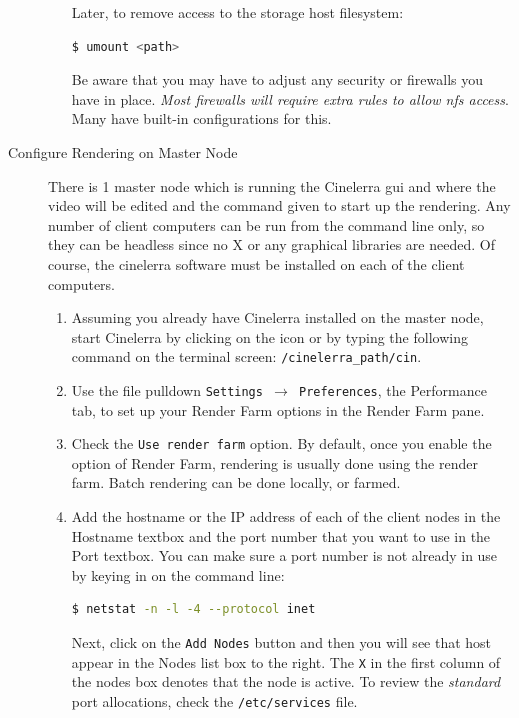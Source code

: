 \begin{description}
\begin{enumerate}
        Later, to remove access to the storage host filesystem:        
        \begin{lstlisting}[language=bash,numbers=none]
$ umount <path>
        \end{lstlisting}
        
        Be aware that you may have to adjust any security or firewalls you have in place.  \textit{Most firewalls will require extra rules to allow nfs access}.  Many have built-in configurations for this. 
    \end{enumerate}
    \item[Configure Rendering on Master Node] There is 1 master node which is running the Cinelerra gui and where the video will be edited and the command given to start up the rendering.  Any number of client computers can be run from the command line only, so they can be headless since no X or any graphical libraries are needed.  Of course, the cinelerra software must be installed on each of the client computers.
    \begin{enumerate}
        \item Assuming you already have Cinelerra installed on the master node, start Cinelerra by clicking on the
        icon or by typing the following command on the terminal screen:  \texttt{/{cinelerra\_path}/cin}.
        \item Use the file pulldown \texttt{Settings $\rightarrow$ Preferences}, the Performance tab, to set up your Render Farm
        options in the Render Farm pane.
        \item Check the \texttt{Use render farm} option.  By default, once you enable the option of Render Farm, rendering is usually done using the render farm.  Batch rendering can be done locally, or farmed.
        \item Add the hostname or the IP address of each of the client nodes in the Hostname textbox and the port
        number that you want to use in the Port textbox.  You can make sure a port number is not already in
        use by keying in on the command line:
        \begin{lstlisting}[language=bash,numbers=none]
$ netstat -n -l -4 --protocol inet
        \end{lstlisting}
        Next, click on the \texttt{Add Nodes}
        button and then you will see that host appear in the Nodes list box to the right.  The \texttt{X} in the first
        column of the nodes box denotes that the node is active.  To review the \textit{standard} port allocations,
        check the \texttt{/etc/services} file.

\end{enumerate}
\end{description}
